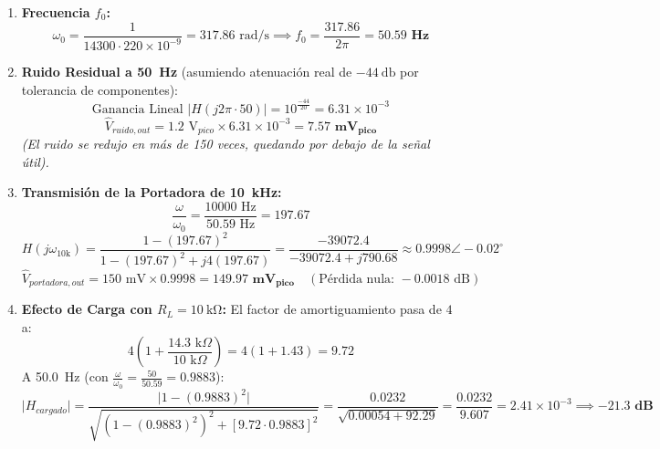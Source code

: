 \documentclass[11pt,a4paper,twoside]{article}
\begin{document}
\begin{enumerate}
    \item \textbf{Frecuencia $f_0$:}
    \begin{equation*}
        \omega_0 = \frac{1}{14300 \cdot 220 \times 10^{-9}} = 317.86\text{ rad/s} \implies f_0 = \frac{317.86}{2\pi} = \mathbf{50.59\text{ Hz}}
    \end{equation*}

    \item \textbf{Ruido Residual a \qty{50}{\hertz}} (asumiendo atenuación real de $\qty{-44}{\decibel}$ por tolerancia de componentes):
    \begin{equation*}
        \text{Ganancia Lineal } \vert{}H(j2\pi \cdot 50)\vert{} = 10^{\frac{-44}{20}} = 6.31 \times 10^{-3}
    \end{equation*}
    \begin{equation*}
        \hat{V}_{ruido, out} = 1.2\text{ V}_{pico} \times 6.31 \times 10^{-3} = \mathbf{7.57\text{ mV}_{pico}}
    \end{equation*}
    \textit{(El ruido se redujo en más de 150 veces, quedando por debajo de la señal útil).}

    \item \textbf{Transmisión de la Portadora de \qty{10}{\kilo\hertz}:}
    \begin{equation*}
        \frac{\omega}{\omega_0} = \frac{10000\text{ Hz}}{50.59\text{ Hz}} = 197.67
    \end{equation*}
    \begin{equation*}
        H(j\omega_{10\text{k}}) = \frac{1 - (197.67)^2}{1 - (197.67)^2 + j4(197.67)} = \frac{-39072.4}{-39072.4 + j790.68} \approx \mathbf{0.9998} \angle -0.02^\circ
    \end{equation*}
    \begin{equation*}
        \hat{V}_{portadora, out} = 150\text{ mV} \times 0.9998 = \mathbf{149.97\text{ mV}_{pico}} \quad (\text{Pérdida nula: } -0.0018\text{ dB})
    \end{equation*}

    \item \textbf{Efecto de Carga con $R_L = \qty{10}{\kilo\ohm}$:}
    El factor de amortiguamiento pasa de $4$ a:
    \begin{equation*}
        4 \left(1 + \frac{14.3\text{ k}\Omega}{10\text{ k}\Omega}\right) = 4 (1 + 1.43) = 9.72
    \end{equation*}
    A \qty{50.0}{\hertz} (con $\frac{\omega}{\omega_0} = \frac{50}{50.59} = 0.9883$):
    \begin{equation*}
        \vert{}H_{cargado}\vert{} = \frac{\vert{}1 - (0.9883)^2\vert{}}{\sqrt{(1 - (0.9883)^2)^2 + [9.72 \cdot 0.9883]^2}} = \frac{0.0232}{\sqrt{0.00054 + 92.29}} = \frac{0.0232}{9.607} = 2.41 \times 10^{-3} \implies \mathbf{-21.3\text{ dB}}
    \end{equation*}
\end{enumerate}
\end{document}
